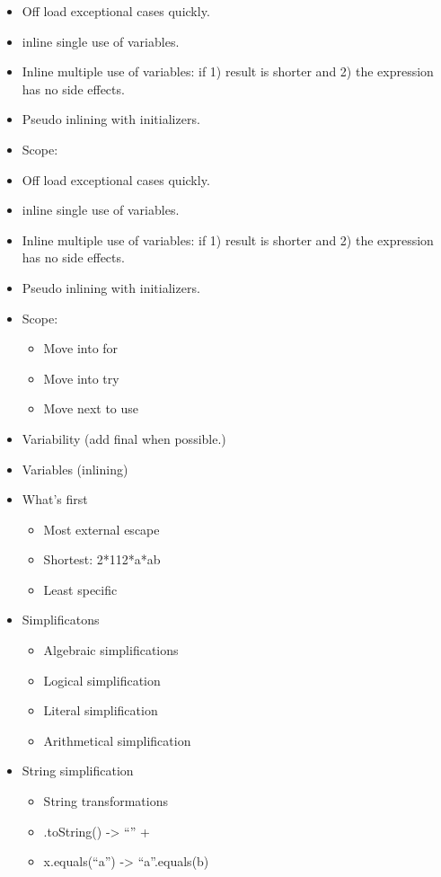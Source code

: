 \begin{itemize}
  \item Off load exceptional cases quickly.
  \item inline single use of variables.
  \item Inline multiple use of variables: if 1) result is shorter and 2) the expression has no side effects.
  \item Pseudo inlining with initializers.
  \item Scope:
\end{itemize}
\begin{itemize}
\item Off load exceptional cases quickly.
\item inline single use of variables.
\item Inline multiple use of variables: if 1) result is shorter and 2) the expression has no side effects.
\item Pseudo inlining with initializers.
\item Scope:
\begin{itemize}
 \item Move into for
 \item Move into try
 \item Move next to use
\end{itemize}
\item Variability (add final when possible.)
\item Variables (inlining)
\item What’s first
\begin{itemize}
 \item Most external escape
 \item Shortest: 2*112*a*ab
 \item Least specific
\end{itemize}
\item Simplificatons
\begin{itemize}
 \item Algebraic simplifications
 \item Logical simplification
 \item Literal simplification
 \item Arithmetical simplification
\end{itemize}
\item String simplification
\begin{itemize}
 \item String transformations
 \item .toString() -> “” +
 \item x.equals(“a”) -> “a”.equals(b)

\end{itemize}
\end{itemize}
